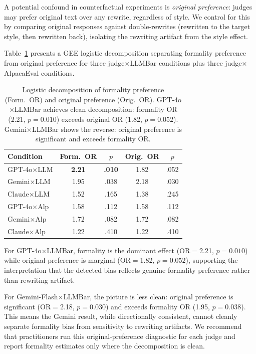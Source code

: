\documentclass[11pt,a4paper]{article}
\newcommand{\sig}[1]{\textcolor{siggreen}{\textbf{#1}}}
\begin{document}
A potential confound in counterfactual experiments is \emph{original preference}: judges may prefer original text over any rewrite, regardless of style.
We control for this by comparing original responses against double-rewrites (rewritten to the target style, then rewritten back), isolating the rewriting artifact from the style effect.

Table~\ref{tab:decomp} presents a GEE logistic decomposition separating formality preference from original preference for three judge$\times$LLMBar conditions plus three judge$\times$AlpacaEval conditions.

\begin{table}[t]
\centering
\small
\setlength{\tabcolsep}{3pt}
\begin{tabular}{@{}lcccc@{}}
\toprule
\textbf{Condition} & \textbf{Form.\ OR} & $p$ & \textbf{Orig.\ OR} & $p$ \\
\midrule
GPT-4o$\times$LLM & \sig{2.21} & \sig{.010} & 1.82 & .052 \\
Gemini$\times$LLM & 1.95 & .038 & 2.18 & .030 \\
Claude$\times$LLM & 1.52 & .165 & 1.38 & .245 \\
\midrule
GPT-4o$\times$Alp & 1.58 & .112 & 1.58 & .112 \\
Gemini$\times$Alp & 1.72 & .082 & 1.72 & .082 \\
Claude$\times$Alp & 1.22 & .410 & 1.22 & .410 \\
\bottomrule
\end{tabular}
\caption{Logistic decomposition of formality preference (Form.\ OR) and original preference (Orig.\ OR). GPT-4o$\times$LLMBar achieves clean decomposition: formality OR (2.21, $p{=}0.010$) exceeds original OR (1.82, $p{=}0.052$). Gemini$\times$LLMBar shows the reverse: original preference is significant and exceeds formality OR.}
\label{tab:decomp}
\end{table}

For GPT-4o$\times$LLMBar, formality is the dominant effect (OR$=$2.21, $p{=}0.010$) while original preference is marginal (OR$=$1.82, $p{=}0.052$), supporting the interpretation that the detected bias reflects genuine formality preference rather than rewriting artifact.

For Gemini-Flash$\times$LLMBar, the picture is less clean: original preference is significant (OR$=$2.18, $p{=}0.030$) and exceeds formality OR (1.95, $p{=}0.038$).
This means the Gemini result, while directionally consistent, cannot cleanly separate formality bias from sensitivity to rewriting artifacts.
We recommend that practitioners run this original-preference diagnostic for each judge and report formality estimates only where the decomposition is clean.
\end{document}
